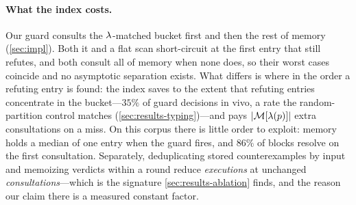 \paragraph{What the index costs.}
Our guard consults the $\lambda$-matched bucket first and then the rest of memory
(\cref{sec:impl}). Both it and a flat scan short-circuit at the first entry
that still refutes, and both consult all of memory when none does, so their
worst cases coincide and no asymptotic separation exists. What differs is where
in the order a refuting entry is found: the index saves to the extent that
refuting entries concentrate in the bucket---$35\%$ of guard decisions in vivo,
a rate the random-partition control matches (\cref{sec:results-typing})---and
pays $\lvert\mathcal{M}[\lambda(p)]\rvert$ extra consultations on a miss. On this corpus
there is little order to exploit: memory holds a median of one entry when the
guard fires, and $86\%$ of blocks resolve on the first consultation. Separately, deduplicating stored
counterexamples by input and memoizing verdicts within a round reduce
\emph{executions} at unchanged \emph{consultations}---which is the signature
\cref{sec:results-ablation} finds, and the reason our claim there is a measured
constant factor.
